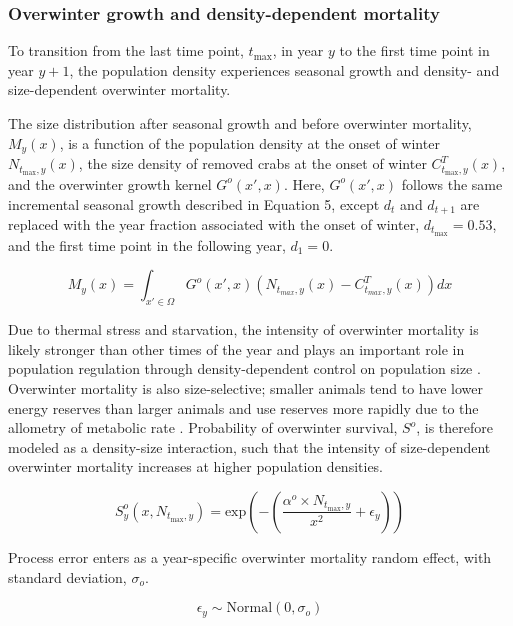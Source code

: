 \documentclass{article}
\begin{document}
\subsubsection*{Overwinter growth and density-dependent mortality}

To transition from the last time point, $t_{\text{max}}$, in year $y$ to the first time point in year $y+1$, the population density experiences seasonal growth and density- and size-dependent overwinter mortality. 

The size distribution after seasonal growth and before overwinter mortality, $M_y(x)$, is a function of the population density at the onset of winter $N_{t_{\text{max}}, y}(x)$, the size density of removed crabs at the onset of winter $C^T_{t_{\text{max}}, y}(x)$, and the overwinter growth kernel $G^o(x',x)$. Here, $G^o(x',x)$ follows the same incremental seasonal growth described in Equation 5, except $d_t$ and $d_{t+1}$ are replaced with the year fraction associated with the onset of winter, $d_{t_\text{max}} = 0.53$, and the first time point in the following year, $d_1 = 0$.

\begin{equation}
M_y(x) = \int_{x' \in \Omega} G^o(x',x) (N_{t_{max},y}(x) - C^T_{t_{max},y}(x))dx
\end{equation}

Due to thermal stress and starvation, the intensity of overwinter mortality is likely stronger than other times of the year and plays an important role in population regulation through density-dependent control on population size \parencite{henderson1988size}. Overwinter mortality is also size-selective; smaller animals tend to have lower energy reserves than larger animals and use reserves more rapidly due to the allometry of metabolic rate \parencite{hurst2007causes}. Probability of overwinter survival, $S^o$, is therefore modeled as a density-size interaction, such that the intensity of size-dependent overwinter mortality increases at higher population densities.

\begin{equation}
S_y^o(x,N_{t_{\text{max}},y}) = \text{exp}\left(-(\frac{\alpha^o \times N_{t_{\text{max}},y}}{x^2} + \epsilon_y)\right)
\end{equation}

Process error enters as a year-specific overwinter mortality random effect, with standard deviation, $\sigma_o$.

\begin{equation}
\epsilon_y \sim \text{Normal}(0, \sigma_o)
\end{equation}
\end{document}
